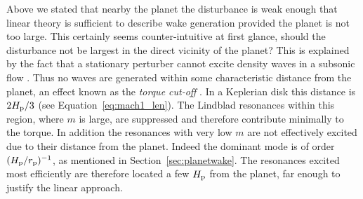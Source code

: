 Above we stated that nearby the planet the disturbance is weak enough that linear theory is sufficient to describe wake generation provided the planet is not too large.
This certainly seems counter-intuitive at first glance, should the disturbance not be largest in the direct vicinity of the planet?
This is explained by the fact that a stationary perturber cannot excite density waves in a subsonic flow \citep{landau1987}.
Thus no waves are generated within some characteristic distance from the planet, an effect known as the \textit{torque cut-off} \citep{goldreich1980}.
In a Keplerian disk this distance is $2H_{\rm p}/3$ (see Equation~\ref{eq:mach1_len}).
The Lindblad resonances within this region, where $m$ is large, are suppressed and therefore contribute minimally to the torque.
In addition the resonances with very low $m$ are not effectively excited due to their distance from the planet.
Indeed the dominant mode is of order $(H_{\rm p} / r_{\rm p})^{-1}$, as mentioned in Section~\ref{sec:planetwake}.
The resonances excited most efficiently are therefore located a few $H_{\rm p}$ from the planet, far enough to justify the linear approach.

